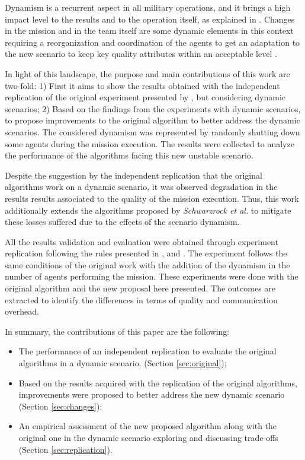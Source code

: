 Dynamism is a recurrent aspect in all military operations, and it brings a high impact level to the results and to the operation itself, as explained in \cite{CC02}. Changes in the mission and in the team itself are some dynamic elements in this context requiring a reorganization and coordination of the agents to get an adaptation to the new scenario to keep key quality attributes within an acceptable level \cite{FRANCE2014}. 

In light of this landscape, the purpose and main contributions of this work are two-fold: 1) First it aims to show the results obtained with the independent replication of the original experiment presented by \cite{MAS07}, but considering dynamic scenarios; 2) Based on the findings from the experiments with dynamic scenarios, to propose improvements to the original algorithm to better address the dynamic scenarios. The considered dynamism was represented by randomly shutting down some agents during the mission execution. The results were collected to analyze the performance of the algorithms facing this new unstable scenario.

Despite the suggestion by the independent replication that the original algorithms work \cite{MAS07} on a dynamic scenario, it was observed degradation in the results results associated to the quality of the mission execution. Thus, this work additionally extends the algorithms proposed by \textit{Schwarzrock et al.} to mitigate these losses suffered due to the effects of the scenario dynamism.

All the results validation and evaluation were obtained through experiment replication following the rules presented in \cite{exp01}, \cite{exp03} and \cite{exp04}. The experiment follows the same conditions of the original work with the addition of the dynamism in the number of agents performing the mission. These experiments were done with the original algorithm and the new proposal here presented. The outcomes are extracted to identify the differences in terms of quality and communication overhead.

In summary, the contributions of this paper are the following:

\begin{itemize}
   \item The performance of an independent replication to evaluate the original algorithms in a dynamic scenario. (Section \ref{sec:original});
   \item Based on the results acquired with the replication of the original algorithms, improvements were proposed to better address the new dynamic scenario (Section \ref{sec:changes});
   \item An empirical assessment of the new proposed algorithm along with the original one in the dynamic scenario exploring and discussing trade-offs (Section \ref{sec:replication}).
\end{itemize}

